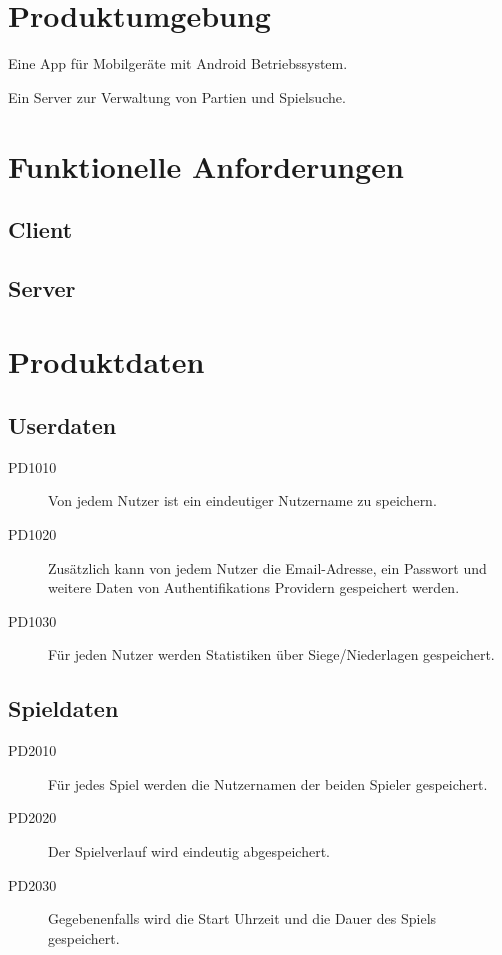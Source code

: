 \documentclass[parskip=full]{scrartcl}
\begin{document}
\section{Produktumgebung}
	\begin{description}
		\item Eine App für Mobilgeräte mit Android Betriebssystem.
		\item Ein Server zur Verwaltung von Partien und Spielsuche.		
	\end{description}
\section{Funktionelle Anforderungen}
\subsection{Client}
\subsection{Server}

\section{Produktdaten}

\subsection{Userdaten}
\begin{description}
	
\item[PD1010] Von jedem Nutzer ist ein eindeutiger Nutzername zu speichern.
\item[PD1020] Zusätzlich kann von jedem Nutzer die Email-Adresse, ein Passwort 	und weitere Daten von Authentifikations Providern gespeichert werden.
\item [PD1030] Für jeden Nutzer werden Statistiken über Siege/Niederlagen gespeichert.

\end{description}

\subsection{Spieldaten}
\begin{description}
	
\item[PD2010] Für jedes Spiel werden die Nutzernamen der beiden Spieler gespeichert.
\item[PD2020] Der Spielverlauf wird eindeutig abgespeichert.
\item[PD2030] Gegebenenfalls wird die Start Uhrzeit und die Dauer des Spiels gespeichert.

\end{description}
\end{document}
